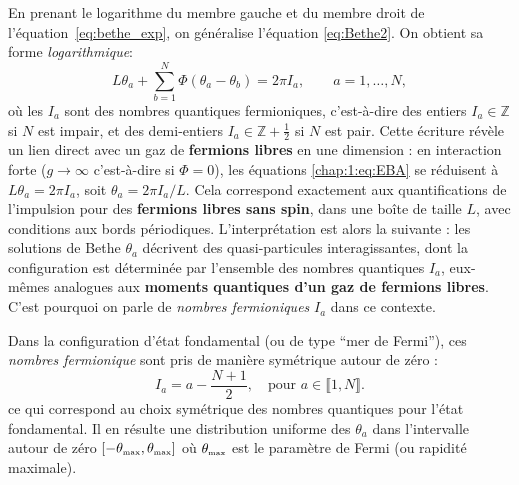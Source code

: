 En prenant le logarithme du membre gauche et du membre droit de l’équation~\eqref{eq:bethe_exp}, on généralise l'équation \eqref{eq:Bethe2}. On obtient sa forme {\em logarithmique}:
\begin{equation}\label{chap:1:eq:EBA}
	L \theta_a + \sum_{b=1}^N \Phi(\theta_a - \theta_b) = 2\pi I_a, \qquad a = 1, \dots, N,
\end{equation}
où les $I_a$ sont des nombres quantiques fermioniques, c’est-à-dire des entiers $I_a \in \mathbb{Z}$ si $N$ est impair, et des demi-entiers $I_a \in \mathbb{Z} + \tfrac{1}{2}$ si $N$ est pair.
\medskip
Cette écriture révèle un lien direct avec un gaz de {\bf fermions libres} en une dimension : en interaction forte (\ie $g \to \infty$ c’est-à-dire si $\Phi = 0$), les équations \eqref{chap:1:eq:EBA} se réduisent à $L \theta_a = 2\pi I_a$, soit $\theta_a = 2\pi I_a / L$. Cela correspond exactement aux quantifications de l'impulsion pour des {\bf fermions libres sans spin}, dans une boîte de taille $L$, avec conditions aux bords périodiques.
\medskip
L’interprétation est alors la suivante : les solutions de Bethe ${ \theta_a }$ décrivent des quasi-particules interagissantes, dont la configuration est déterminée par l’ensemble des nombres quantiques ${ I_a }$, eux-mêmes analogues aux {\bf moments quantiques d’un gaz de fermions libres}. C’est pourquoi on parle de {\em nombres fermioniques} $I_a$ dans ce contexte.

\medskip
Dans la configuration d’état fondamental (ou de type “mer de Fermi”), ces {\em nombres fermionique} sont pris de manière symétrique autour de zéro :
\begin{equation}\label{chap:1:eq:EBA.1}
	I_a = a - \frac{N+1}{2}, \quad \text{pour } a \in \llbracket 1 , N \rrbracket.
\end{equation}
ce qui correspond au choix symétrique des nombres quantiques pour l’état fondamental. Il en résulte une distribution uniforme des $\theta_a$ dans l’intervalle autour de zéro $[-\theta_{\mbox{\tiny max}} , \theta_{\mbox{\tiny max}} ]$ où \( \theta_{\mbox{\tiny max}} \) est le paramètre de Fermi (ou rapidité maximale).


